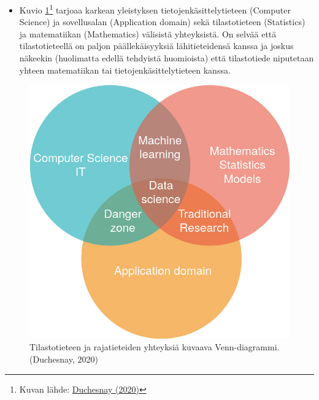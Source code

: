 \documentclass[
]{book}
\providecommand{\tightlist}{%
  \setlength{\itemsep}{0pt}\setlength{\parskip}{0pt}}
\begin{document}
\begin{itemize}
\tightlist
\item
  Kuvio \ref{fig:datasc}\footnote{Kuvan lähde: \href{https://duchesnay.github.io/pystatsml/introduction/machine_learning.html}{Duchesnay (2020)}} tarjoaa karkean yleistyksen tietojenkäsittelytieteen (Computer Science) ja sovellusalan (Application domain) sekä tilastotieteen (Statistics) ja matematiikan (Mathematics) välisistä yhteyksistä. On selvää että tilastotieteellä on paljon päällekäisyyksiä lähitieteidensä kanssa ja joskus näkeekin (huolimatta edellä tehdyistä huomioista) että tilastotiede niputetaan yhteen matematiikan tai tietojenkäsittelytieteen kanssa.
\end{itemize}

\begin{figure}

{\centering \includegraphics[width=1\linewidth]{images/data_science} 

}

\caption{Tilastotieteen ja rajatieteiden yhteyksiä kuvaava Venn-diagrammi. (Duchesnay, 2020)}\label{fig:datasc}
\end{figure}
\end{document}
